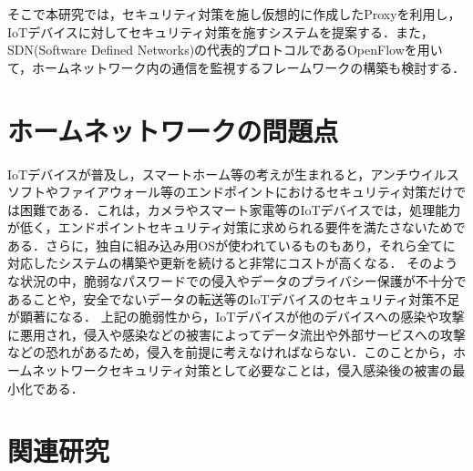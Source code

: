 \documentclass[Japanese]{dicomopapers}
\begin{document}
そこで本研究では，セキュリティ対策を施し仮想的に作成したProxyを利用し，IoTデバイスに対してセキュリティ対策を施すシステムを提案する．また，SDN(Software Defined Networks)の代表的プロトコルであるOpenFlow\cite{openflow}を用いて，ホームネットワーク内の通信を監視するフレームワークの構築も検討する．

\section{ホームネットワークの問題点}
IoTデバイスが普及し，スマートホーム等の考えが生まれると，アンチウイルスソフトやファイアウォール等のエンドポイントにおけるセキュリティ対策だけでは困難である．これは，カメラやスマート家電等のIoTデバイスでは，処理能力が低く，エンドポイントセキュリティ対策に求められる要件を満たさないためである\cite{camera}．さらに，独自に組み込み用OSが使われているものもあり，それら全てに対応したシステムの構築や更新を続けると非常にコストが高くなる．
そのような状況の中，脆弱なパスワードでの侵入やデータのプライバシー保護が不十分であることや，安全でないデータの転送等のIoTデバイスのセキュリティ対策不足が顕著になる\cite{owasp}．
上記の脆弱性から，IoTデバイスが他のデバイスへの感染や攻撃に悪用され，侵入や感染などの被害によってデータ流出や外部サービスへの攻撃などの恐れがあるため，侵入を前提に考えなければならない．このことから，ホームネットワークセキュリティ対策として必要なことは，侵入感染後の被害の最小化である．

\section{関連研究}
\end{document}
